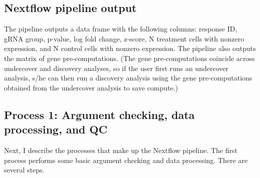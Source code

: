 \documentclass[12pt]{article}
\begin{document}
\subsection*{Nextflow pipeline output}

The pipeline outputs a data frame with the following columns: response ID, gRNA group, p-value, log fold change, z-score, N treatment cells with nonzero expression, and N control cells with nonzero expression. The pipeline also outputs the matrix of gene pre-computations. (The gene pre-computations coincide across undercover and discovery analyses, so if the user first runs an undercover analysis, s/he can then run a discovery analysis using the gene pre-computations obtained from the undercover analysis to save compute.)

\subsection*{Process 1: Argument checking, data processing, and QC}

Next, I describe the processes that make up the Nextflow pipeline.  The first process performs some basic argument checking and data processing. There are several steps.
\end{document}
